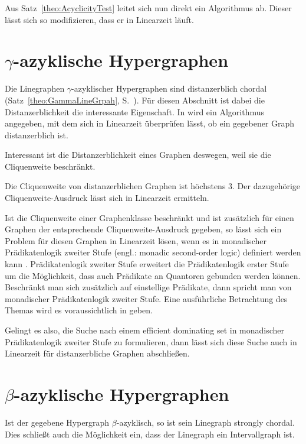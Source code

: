 Aus Satz~\ref{theo:AcyclicityTest} leitet sich nun direkt ein Algorithmus ab. Dieser lässt sich so modifizieren, dass er in Linearzeit läuft.

\section{$\gamma$-azyklische Hypergraphen}
Die Linegraphen $\gamma$-azyklischer Hypergraphen sind distanzerblich chordal (Satz~\ref{theo:GammaLineGrpah}, S.~\pageref{theo:GammaLineGrpah}). Für diesen Abschnitt ist dabei die Distanzerblichkeit die interessante Eigenschaft. In \cite{Damiand200199} wird ein Algorithmus angegeben, mit dem sich in Linearzeit überprüfen lässt, ob ein gegebener Graph distanzerblich ist.

Interessant ist die Distanzerblichkeit eines Graphen deswegen, weil sie die Cliquenweite beschränkt.

\begin{Theorem} \cite{cliqueWidthPerfectGraphs}
    Die Cliquenweite von distanzerblichen Graphen ist höchstens 3. Der dazugehörige Cliquenweite-Ausdruck lässt sich in Linearzeit ermitteln.
\end{Theorem}

Ist die Cliquenweite einer Graphenklasse beschränkt und ist zusätzlich für einen Graphen der entsprechende Cliquenweite-Ausdruck gegeben, so lässt sich ein Problem für diesen Graphen in Linearzeit lösen, wenn es in monadischer Prädikatenlogik zweiter Stufe (engl.: monadic second-order logic)  definiert werden kann \cite{ClWidthSOL}. Prädikatenlogik zweiter Stufe erweitert die Prädikatenlogik erster Stufe um die Möglichkeit, dass auch Prädikate an Quantoren gebunden werden können. Beschränkt man sich zusätzlich auf einstellige Prädikate, dann spricht man von monadischer Prädikatenlogik zweiter Stufe. Eine ausführliche Betrachtung des Themas wird es voraussichtlich in \cite{GrStrucAndMSOL} geben.

 Gelingt es also, die Suche nach einem efficient dominating set in monadischer Prädikatenlogik zweiter Stufe zu formulieren, dann lässt sich diese Suche auch in Linearzeit für distanzerbliche Graphen abschließen.
 


\section{$\beta$-azyklische Hypergraphen}
Ist der gegebene Hypergraph $\beta$-azyklisch, so ist sein Linegraph strongly chordal. Dies schließt auch die Möglichkeit ein, dass der Linegraph ein Intervallgraph ist.


